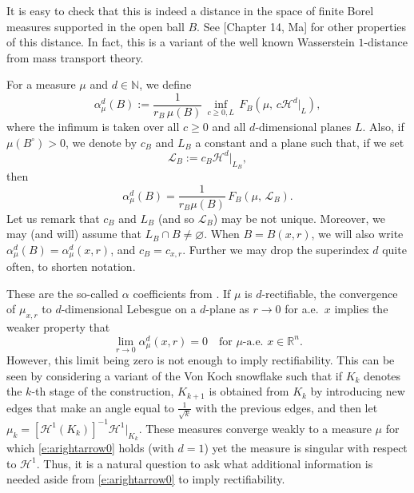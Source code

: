 \documentclass[11pt]{amsart}
\newcommand{\R}{{\mathbb R}}       %
\newcommand{\N}{{\mathbb N}}       %
\newcommand{\HH}{{\mathcal H}}
\newcommand{\LL}{{\mathcal L}}
\newcommand{\Bl}{\color{blue}}
\theoremstyle{definition}
\theoremstyle{remark}
\numberwithin{equation}{section}
\newcommand{\xavi}[1]{}%
\def\cH{{\mathcal{H}}}
\begin{document}
It is easy to check that this is indeed a distance in the space of finite Borel measures supported in the open ball $B$. See [Chapter 14, Ma] for other properties of this distance. In fact, this is a variant of the well known Wasserstein $1$-distance from mass transport theory. 

For a measure $\mu$ and $d\in \N$, we define
\begin{equation}\label{alpha-def}
\alpha_\mu^{d}(B) := \frac1{r_{B}\,\mu(B)}\,\inf_{c\geq0,L} \,F_{B}(\mu,\,c\HH^{d}|_{L}),
\end{equation}
where the infimum is taken over all $c\geq0$ and all $d$-dimensional planes $L$. Also, { if $\mu(B^{\circ})>0$,} we denote by $c_B$ and $L_B$ a constant and a plane such that, if we set
\begin{equation}\label{L-def}
\LL_{B} :=c_B\HH^{d}|_{L_B}, 
\end{equation}
then
\begin{equation}\label{cL-ppts}
\alpha_\mu^{d}(B) =  \frac1{r_{B}\mu(B)}\,F_{B}(\mu,\,\LL_B). %
\end{equation}
Let us remark that $c_B$ and $L_B$ (and so $\LL_B$) may be not unique. Moreover, we may (and will) assume that 
$L_B\cap B\neq\varnothing$.
When $B=B(x,r)$, we will also write $\alpha_{\mu}^d(B)=\alpha_{\mu}^d(x,r)$, and $c_{B}=c_{x,r}$. 
{Further we may drop the superindex $d$ quite often, to shorten notation.} \xavi{Added this sentence}

These are the so-called $\alpha$ coefficients from \cite{Tol09}. If $\mu$ is $d$-rectifiable, the convergence of $\mu_{x,r}$ to $d$-dimensional Lebesgue on a $d$-plane as $r\rightarrow 0$ for a.e.\ $x$ implies the weaker property that 
\begin{equation}\label{e:arightarrow0}
\lim_{r\rightarrow 0} \alpha_{\mu}^{d}(x,r)=0 \quad\mbox{for $\mu$-a.e. }x\in \R^{n}. 
\end{equation}
However, this limit being zero is not enough to imply rectifiability. This can be seen by considering a variant of the Von Koch snowflake such that if $K_k$ denotes the $k$-th stage of the construction, $K_{k+1}$ is obtained from $K_k$ by introducing new edges that make an angle equal to  $\frac{1}{\sqrt{k}}$ with the previous edges, and then let $\mu_{k} = [\cH^{1}(K_{k})]^{-1}\cH^{1}|_{K_{k}}$. These measures converge weakly to a measure $\mu$ for which \eqref{e:arightarrow0} holds (with $d=1$) yet the measure is singular with respect to $\cH^{1}$. Thus, it is a natural question to ask what additional information is needed aside from \eqref{e:arightarrow0} to imply rectifiability. 
\end{document}
